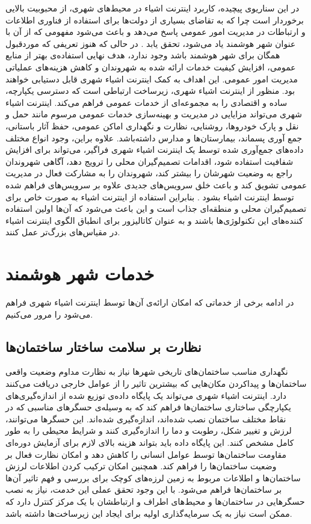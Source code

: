     در این سناریوی پیچیده، کاربرد اینترنت اشیاء در محیط‌های شهری، از محبوبیت بالایی برخوردار است چرا که به تقاضای بسیاری از دولت‌ها برای استفاده از فناوری‌ اطلاعات و ارتباطات در مدیریت امور عمومی پاسخ می‌دهد و باعث می‌شود مفهومی که از آن با عنوان شهر هوشمند یاد می‌شود، تحقق یابد \cite{schaffers2011smart}.
    در حالی که هنوز تعریفی که موردقبول همگان برای شهر هوشمند باشد وجود ندارد، هدف نهایی استفاده‌ی بهتر از منابع عمومی، افزایش کیفیت خدمات ارائه شده به شهروندان و کاهش هزینه‌های عملیاتی مدیریت امور عمومی.
    این اهداف به کمک اینترنت اشیاء شهری قابل دستیابی خواهند بود.
    منظور از اینترنت اشیاء شهری، زیرساخت ارتباطی است که دسترسی یکپارچه، ساده و اقتصادی را به مجموعه‌ای از خدمات عمومی فراهم می‌کند.
    اینترنت اشیاء شهری می‌تواند مزایایی در مدیریت و بهینه‌سازی خدمات عمومی مرسوم مانند حمل و نقل و پارک خودرو‌ها، روشنایی، نظارت و نگهداری اماکن عمومی، حفظ آثار باستانی، جمع آوری پسماند، بیمارستان‌ها و مدارس داشته‌باشد.
    علاوه براین، وجود انواع مختلف داده‌های جمع‌آوری شده توسط یک اینترنت اشیاء شهری فراگیر، می‌تواند برای افزایش شفافیت استفاده شود، اقدامات تصمیم‌گیران محلی را ترویج دهد، آگاهی شهروندان راجع به وضعیت شهرشان را بیشتر کند، شهروندان را به مشارکت فعال در مدیریت عمومی تشویق کند و باعث خلق سرویس‌های جدیدی علاوه بر سرویس‌های فراهم شده توسط اینترنت اشیاء بشود \cite{cuff2008urban}.
    بنابراین استفاده از اینترنت اشیاء به صورت خاص برای تصمیم‌گیران محلی و منطقه‌ای جذاب است و این باعث می‌شود که آن‌ها اولین استفاده کننده‌های این تکنولوژی‌ها باشند و به عنوان کاتالیزور برای انطباق الگوی اینترنت اشیاء در مقیاس‌های بزرگ‌تر عمل کنند.

  \section{خدمات شهر هوشمند}
    در ادامه برخی از خدماتی که امکان ارائه‌ی آن‌ها توسط اینترنت اشیاء شهری فراهم می‌شود را مرور می‌کنیم.
    \subsection{نظارت بر سلامت ساختار ساختمان‌ها}
      نگهداری مناسب ساختمان‌های تاریخی شهر‌ها نیاز به نظارت مداوم وضعیت واقعی ساختمان‌ها و پیدا‌کردن‌ مکان‌هایی که بیشترین تاثیر را از عوامل خارجی دریافت می‌کنند دارد.
      اینترنت اشیاء شهری می‌تواند یک پایگاه داده‌ی توزیع شده از اندازه‌گیری‌های یکپارچگی ساختاری ساختمان‌ها فراهم ‌کند که به وسیله‌ی حسگر‌های مناسبی که در نقاط مختلف ساختمان نصب شده‌اند، اندازه‌گیری شده‌اند.
      این حسگر‌ها می‌توانند، لرزش و تغییر شکل، رطوبت و دما را اندازه‌گیری کنند و شرایط محیطی را به طور کامل مشخص کنند\cite{lynch2006summary}.
      این پایگاه داده باید بتواند هزینه بالای لازم برای آزمایش دوره‌ای مقاومت ساختمان‌ها توسط عوامل انسانی را کاهش دهد و امکان نظارت فعال بر وضعیت ساختمان‌ها را فراهم کند.
      همچنین امکان ترکیب کردن اطلاعات لرزش ساختمان‌ها و اطلاعات مربوط به زمین لرزه‌های کوچک برای بررسی و فهم تاثیر آن‌ها بر ساختمان‌ها فراهم می‌شود.
      با این وجود تحقق عملی این خدمت، نیاز به نصب حسگر‌هایی در ساختمان‌ها و محیط‌های اطراف و ارتباطشان با یک مرکز کنترل دارد که ممکن است نیاز به یک سرمایه‌گذاری اولیه برای ایجاد این زیرساخت‌ها داشته باشد.

